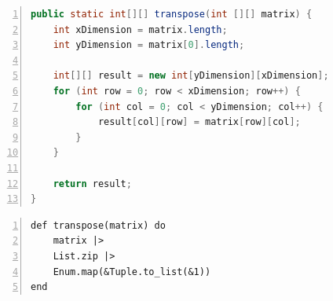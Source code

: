 \documentclass[12pt,twoside]{article}
\begin{document}
\begin{lstlisting}[language=Java, numbers=left, caption=Java - funkcja transpozycji macierzy]
public static int[][] transpose(int [][] matrix) {
    int xDimension = matrix.length;
    int yDimension = matrix[0].length;

    int[][] result = new int[yDimension][xDimension];
    for (int row = 0; row < xDimension; row++) {
        for (int col = 0; col < yDimension; col++) {
            result[col][row] = matrix[row][col];
        }
    }

    return result;
}
\end{lstlisting}

\begin{lstlisting}[numbers=left, caption=Elixir - funkcja transpozycji macierzy]
def transpose(matrix) do
    matrix |>
    List.zip |>
    Enum.map(&Tuple.to_list(&1))
end
\end{lstlisting}
\end{document}
